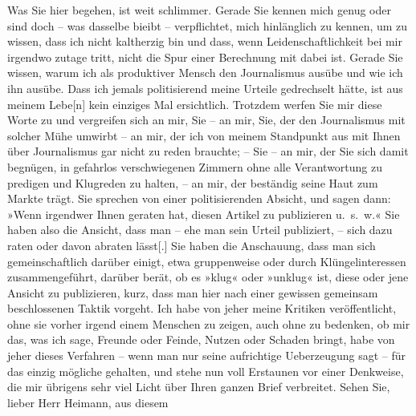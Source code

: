 \begin{ledgroupsized}[t]{13cm}
               Was Sie hier begehen, ist weit schlimmer. Gerade Sie kennen mich genug oder sind doch
               – was dasselbe bieibt – verpflichtet, mich hinlänglich zu kennen, um zu wissen, dass
               ich nicht kaltherzig bin und dass, wenn Leidenschaftlichkeit bei mir irgendwo zutage
               tritt, nicht die Spur einer Berechnung mit dabei ist. Gerade Sie wissen, warum ich
               als produktiver Mensch den Journalismus ausübe und wie ich ihn ausübe. Dass ich
               jemals politisierend meine Urteile gedrechselt hätte, ist aus meinem
                  Lebe{[}n{]} kein einziges Mal ersichtlich. Trotzdem werfen Sie mir
               diese Worte zu und vergreifen sich an mir, Sie – an mir, Sie, der den Journalismus
               mit solcher Mühe umwirbt – an mir, der ich von meinem Standpunkt aus mit Ihnen über
               Journalismus gar nicht zu reden brauchte; – Sie – an mir, der Sie sich damit
               begnügen, in gefahrlos verschwiegenen Zimmern ohne alle Verantwortung zu pre{\pb}digen und Klugreden zu halten, –
               an mir, der beständig seine Haut zum Markte trägt.\pend
           \pstart
           Sie sprechen von einer politisierenden Absicht, und sagen dann: »Wenn irgendwer Ihnen
               geraten hat, diesen Artikel zu publizieren u. s. w.« Sie haben also die Ansicht, dass
               man – ehe man sein Urteil publiziert, – sich dazu raten oder davon abraten
                  lässt{[}.{]} Sie haben die Anschauung, dass man sich
               gemeinschaftlich darüber einigt, etwa gruppenweise oder durch Klüngelinteressen
               zusammengeführt, darüber berät, ob es »klug« oder »unklug« ist, diese oder jene
               Ansicht zu publizieren, kurz, dass man hier nach einer gewissen gemeinsam
               beschlossenen Taktik vorgeht.\pend
           \pstart
           Ich habe von jeher meine Kritiken veröffentlicht, ohne sie vorher irgend einem
               Menschen zu zeigen, auch ohne zu bedenken, ob mir das, was ich sage, Freunde oder
               Feinde, Nutzen oder Schaden bringt, habe von jeher dieses Verfahren – wenn man nur
               seine aufrichtige Ueberzeugung sagt – für das einzig mögliche gehalten, und stehe nun
               voll Erstaunen vor einer Denkweise, die mir übrigens sehr viel Licht über Ihren
               ganzen Brief verbreitet.\pend
           \pstart
           Sehen Sie, lieber Herr Heimann, aus diesem

\end{ledgroupsized}
